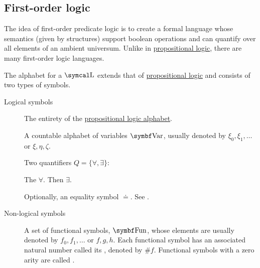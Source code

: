 \subsection{First-order logic}\label{subsec:first_order_logic}

\begin{definition}\label{def:first_order_logic_alphabet}
  The idea of first-order predicate logic is to create a formal language whose semantics (given by structures) support boolean operations and can quantify over all elements of an ambient universum. Unlike in \hyperref[subsec:propositional_logic]{propositional logic}, there are many first-order logic languages.

  The alphabet for a  \( \CL \) extends that of \hyperref[subsec:propositional_logic]{propositional logic} and consists of two types of symbols.

  \begin{description}
    \item[Logical symbols]\mbox{}
    \begin{DefEnum}[series=def:first_order_logic_alphabet]
       The entirety of the \hyperref[subsec:propositional_logic]{propositional logic alphabet}.

       A countable alphabet of variables \( \Bold{Var} \), usually denoted by \( \xi_0, \xi_1, \ldots \) or \( \xi, \eta, \zeta \).

       Two quantifiers \( Q = \{ \forall, \exists \} \):
      \begin{DefEnum}
         The  \( \forall \).
         Then  \( \exists \).
      \end{DefEnum}

       Optionally, an equality symbol \( \doteq \). See .
    \end{DefEnum}

    \item[Non-logical symbols]\mbox{}
    \begin{DefEnum}[resume=def:first_order_logic_alphabet]
       A set of functional symbols, \( \Bold{Fun} \), whose elements are usually denoted by \( f_0, f_1, \ldots \) or \( f, g, h \). Each functional symbol has an associated natural number called its , denoted by \( \# f \). Functional symbols with a zero arity are called .


\end{DefEnum}
\end{description}
\end{definition}

